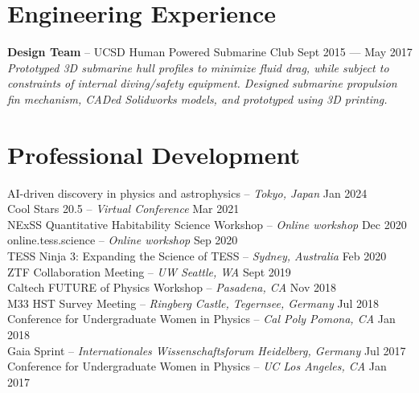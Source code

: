 \documentclass[a4,11pt]{article}
\begin{document}
\section{Engineering Experience}
\textbf{Design Team} -- UCSD Human Powered Submarine Club \hfill Sept 2015 --- May 2017  \\
\textsl{Prototyped 3D submarine hull profiles to minimize fluid drag, while subject to constraints of internal diving/safety equipment. Designed submarine propulsion fin mechanism, CADed Solidworks models, and prototyped using 3D printing. }

\section{Professional Development}

AI-driven discovery in physics and astrophysics -- \textit{Tokyo, Japan} \hfill Jan 2024 \\
Cool Stars 20.5 -- \textit{Virtual Conference} \hfill Mar 2021 \\
NExSS Quantitative Habitability Science Workshop -- \textit{Online workshop} \hfill Dec 2020 \\
online.tess.science -- \textit{Online workshop} \hfill Sep 2020 \\
TESS Ninja 3: Expanding the Science of TESS -- \textit{Sydney, Australia} \hfill Feb 2020 \\
ZTF Collaboration Meeting -- \textit{UW Seattle, WA} \hfill Sept 2019 \\
Caltech FUTURE of Physics Workshop -- \textit{Pasadena, CA} \hfill Nov 2018 \\
M33 HST Survey Meeting -- \textit{Ringberg Castle, Tegernsee, Germany} \hfill Jul 2018 \\
Conference for Undergraduate Women in Physics -- \textit{Cal Poly Pomona, CA}  \hfill Jan 2018 \\
Gaia Sprint -- \textit{Internationales Wissenschaftsforum Heidelberg, Germany}  \hfill Jul 2017 \\
Conference for Undergraduate Women in Physics -- \textit{UC Los Angeles, CA}  \hfill Jan 2017 

\end{document}
